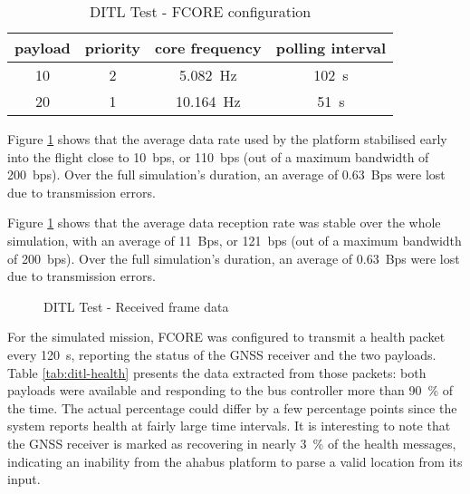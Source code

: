 \begin{table}[h]
\begin{center}
\begin{tabular}{c||c c c}

payload & priority & core frequency & polling interval \\ \hline
10 & 2 & \SI{5.082}{\hertz} & \SI{102}{\second} \\
20 & 1 & \SI{10.164}{\hertz} & \SI{51}{\second} \\

\end{tabular}
\end{center}
\caption {DITL Test - FCORE configuration}
\label{tab:ditl-cfg}
\end{table}

Figure \ref{fig:ditl-bandwidth} shows that the average data rate used by the
platform stabilised early into the flight close to \SI{10}{bps}, or
\SI{110}{bps} (out of a maximum bandwidth of \SI{200}{bps}). Over the full
simulation's duration, an average of \SI{0.63}{Bps} were lost due to
transmission errors.

Figure \ref{fig:ditl-bandwidth} shows that the average data reception rate was
stable over the whole simulation, with an average of \SI{11}{Bps}, or
\SI{121}{bps} (out of a maximum bandwidth of \SI{200}{bps}). Over the full
simulation's duration, an average of \SI{0.63}{Bps} were lost due to
transmission errors.

\begin{figure}[h]
\centering
\caption{DITL Test - Received frame data}
\label{fig:ditl-bandwidth}
\end{figure}

For the simulated mission, FCORE was configured to transmit a health packet
every \SI{120}{\second}, reporting the status of the GNSS receiver and the
two payloads. Table \ref{tab:ditl-health} presents the data extracted from those
packets: both payloads were available and responding to the bus controller more
than \SI{90}{\percent} of the time. The actual percentage could differ by a few
percentage points since the system reports health at fairly large time
intervals. It is interesting to note that the GNSS receiver is marked as
recovering in nearly \SI{3}{\percent} of the health messages, indicating an
inability from the \acrshort{ahabus} platform to parse a valid location from
its input.

